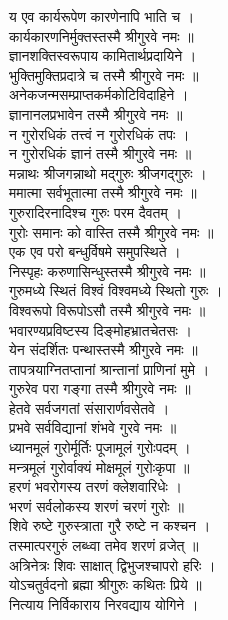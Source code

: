 य एव कार्यरूपेण कारणेनापि भाति च ।\\[-2mm]
कार्यकारणनिर्मुक्तस्तस्मै श्रीगुरवे नमः ॥\\
ज्ञानशक्तिस्वरूपाय कामितार्थप्रदायिने ।\\[-2mm]
भुक्तिमुक्तिप्रदात्रे च तस्मै श्रीगुरवे नमः ॥\\
अनेकजन्मसम्प्राप्तकर्मकोटिविदाहिने ।\\[-2mm]
ज्ञानानलप्रभावेन तस्मै श्रीगुरवे नमः ॥\\
न गुरोरधिकं तत्त्वं न गुरोरधिकं तपः ।\\[-2mm]
न गुरोरधिकं ज्ञानं तस्मै श्रीगुरवे नमः ॥\\
मन्नाथः श्रीजगन्नाथो मद्गुरुः श्रीजगद्गुरुः ।\\[-2mm]
ममात्मा सर्वभूतात्मा तस्मै श्रीगुरवे नमः ॥\\
गुरुरादिरनादिश्च गुरुः परम दैवतम् ।\\[-2mm]
गुरोः समानः को वास्ति तस्मै श्रीगुरवे नमः ॥\\
एक एव परो बन्धुर्विषमे समुपस्थिते ।\\[-2mm]
निस्पृहः करुणासिन्धुस्तस्मै श्रीगुरवे नमः ॥\\
गुरुमध्ये स्थितं विश्वं विश्वमध्ये स्थितो गुरुः ।\\[-2mm]
विश्वरूपो विरूपोऽसौ तस्मै श्रीगुरवे नमः ॥\\
भवारण्यप्रविष्टस्य दिङ्मोहभ्रातचेतसः ।\\[-2mm]
येन संदर्शितः पन्थास्तस्मै श्रीगुरवे नमः ॥\\
तापत्रयाग्नितप्तानां श्रान्तानां प्राणिनां मुमे ।\\[-2mm]
गुरुरेव परा गङ्गा तस्मै श्रीगुरवे नमः ॥\\
हेतवे सर्वजगतां संसारार्णवसेतवे ।\\[-2mm]
प्रभवे सर्वविद्यानां शंभवे गुरवे नमः ॥\\
ध्यानमूलं गुरोर्मूर्तिः पूजामूलं गुरोःपदम् ।\\[-2mm]
मन्त्रमूलं गुरोर्वाक्यं मोक्षमूलं गुरोःकृपा ॥\\
हरणं भवरोगस्य तरणं क्लेशवारिधेः ।\\[-2mm]
भरणं सर्वलोकस्य शरणं चरणं गुरोः ॥\\
शिवे रुष्टे गुरुस्त्राता गुरै रुष्टे न कश्चन ।\\[-2mm]
तस्मात्परगुरुं लब्ध्वा तमेव शरणं व्रजेत् ॥\\
अत्रिनेत्रः शिवः साक्षात् द्विभुजश्चापरो हरिः ।\\[-2mm]
योऽचतुर्वदनो ब्रह्मा श्रीगुरुः कथितः प्रिये ॥\\
नित्याय निर्विकाराय निरवद्याय योगिने ।\\[-2mm]
